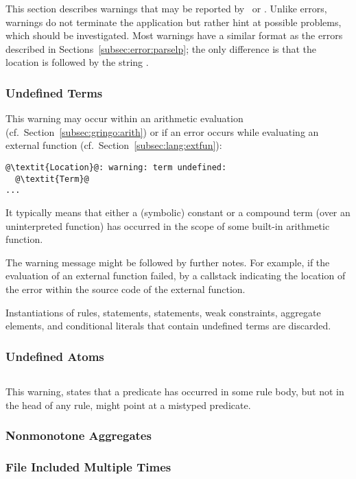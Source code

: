 This section describes warnings that may be reported by \gringo\ or \clingo.
Unlike errors, warnings do not terminate the application 
but rather hint at possible problems, which should be investigated.
Most warnings have a similar format as the errors described in Sections~\ref{subsec:error:parselp};
the only difference is that the location is followed by the string .

\subsubsection{Undefined Terms}\label{sec:warn:undefterm}
This warning may occur within an arithmetic evaluation (cf.~Section~\ref{subsec:gringo:arith})
or if an error occurs while evaluating an external function (cf.~Section~\ref{subsec:lang:extfun}):
%
\begin{lstlisting}[numbers=none,escapechar=@]
@\textit{Location}@: warning: term undefined:
  @\textit{Term}@
...
\end{lstlisting}
%
It typically means that either a (symbolic) constant or a compound term (over an uninterpreted function)
has occurred in the scope of some built-in arithmetic function.

The warning message might be followed by further notes.
For example, if the evaluation of an external function failed,
by a callstack indicating the location of the error within the source code of the external function.

Instantiations of rules,  statements,  statements, weak constraints, aggregate elements, and conditional literals
that contain undefined terms are discarded.

\subsubsection{Undefined Atoms}\label{sec:warn:undefatm}
\begin{lstlisting}[numbers=none,escapechar=@]
% warning: @\textit{p}@/@\!\textit{i}@ is never defined
\end{lstlisting}
%
This warning, states that a predicate 
has occurred in some rule body, but not in the head of any rule,
might point at a mistyped predicate.

\subsubsection{Nonmonotone Aggregates}\label{sec:warn:nonmon}

\subsubsection{File Included Multiple Times}\label{sec:warn:incfile}

